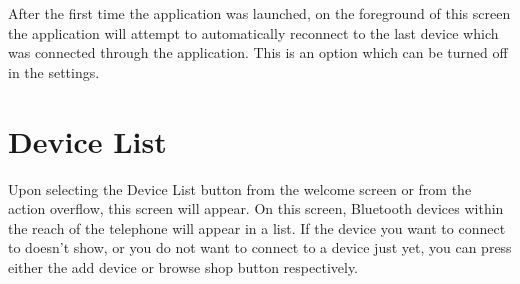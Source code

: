 		After the first time the application was launched, on the foreground of this screen the application will attempt to automatically reconnect to the last device which was connected through the application. This is an option which can be turned off in the settings. 
		\newpage
	\section{Device List}
		Upon selecting the Device List button from the welcome screen or from the action overflow, this screen will appear. On this screen, Bluetooth devices within the reach of the telephone will appear in a list. If the device you want to connect to doesn't show, or you do not want to connect to a device just yet, you can press either the add device or browse shop button respectively.\\
